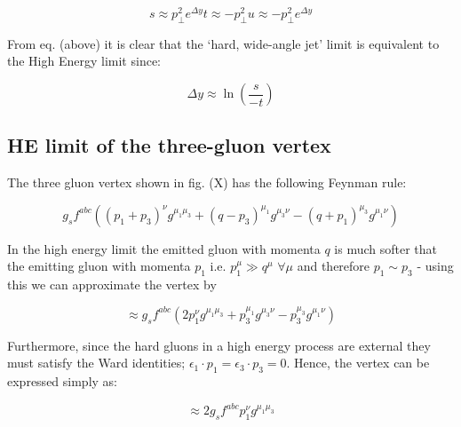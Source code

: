 	\begin{subequations}
		\begin{equation}
			s \approx p_\perp^2 e^{\Delta y}
		\end{equation}
		\begin{equation}
			t \approx -p_\perp^2
		\end{equation}
		\begin{equation}
			u \approx -p_\perp^2 e^{\Delta y}
		\end{equation}
	\end{subequations}

	From eq. (above) it is clear that the `hard, wide-angle jet' limit is equivalent to the High Energy limit since:

	\begin{equation}
		\Delta y \approx \ln \left(\frac{s}{-t}\right)
	\end{equation}

	\subsection{HE limit of the three-gluon vertex}
	\label{sub:subsection_name}

	The three gluon vertex shown in fig. (X) has the following Feynman rule:

	\begin{equation}
		g_s f^{abc} \left((p_1+p_3)^\nu g^{\mu_1\mu_3} + (q-p_3)^{\mu_1}g^{\mu_3\nu} - (q+p_1)^{\mu_3}g^{\mu_1\nu}\right)
	\end{equation}

	In the high energy limit the emitted gluon with momenta $q$ is much softer that the emitting gluon with momenta $p_1$ i.e. $p_1^\mu \gg q^\mu$  $\forall \mu$ and therefore $p_1\sim p_3$ - using this we can approximate the vertex by

	\begin{equation}
		\approx g_s f^{abc} \left(2p_1^\nu g^{\mu_1\mu_3} + p_3^{\mu_1}g^{\mu_3\nu} - p_3^{\mu_3}g^{\mu_1\nu}\right)
	\end{equation}

	Furthermore, since the hard gluons in a high energy process are external they must satisfy the Ward identities; $\epsilon_1\cdot p_1 = \epsilon_3\cdot p_3 = 0$.  Hence, the vertex can be expressed simply as:

	\begin{equation}
		\approx 2g_s f^{abc}p_1^\nu g^{\mu_1\mu_3}
	\end{equation}

